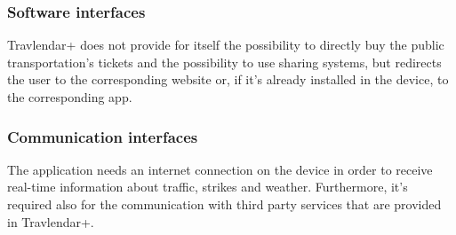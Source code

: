 \documentclass[12pt,titlepage]{article}
\begin{document}
\subsubsection{Software interfaces}\label{sec:mod1}
Travlendar+ does not provide for itself the possibility to directly buy the public transportation's tickets and the possibility to use sharing systems, but redirects the user to the corresponding website or, if it's already installed in the device, to the corresponding app.

\subsubsection{Communication interfaces}\label{sec:mod1}
The application needs an internet connection on the device in order to receive real-time information about traffic, strikes and weather. Furthermore, it's required also for the communication with third party services that are provided in Travlendar+. 
\end{document}
